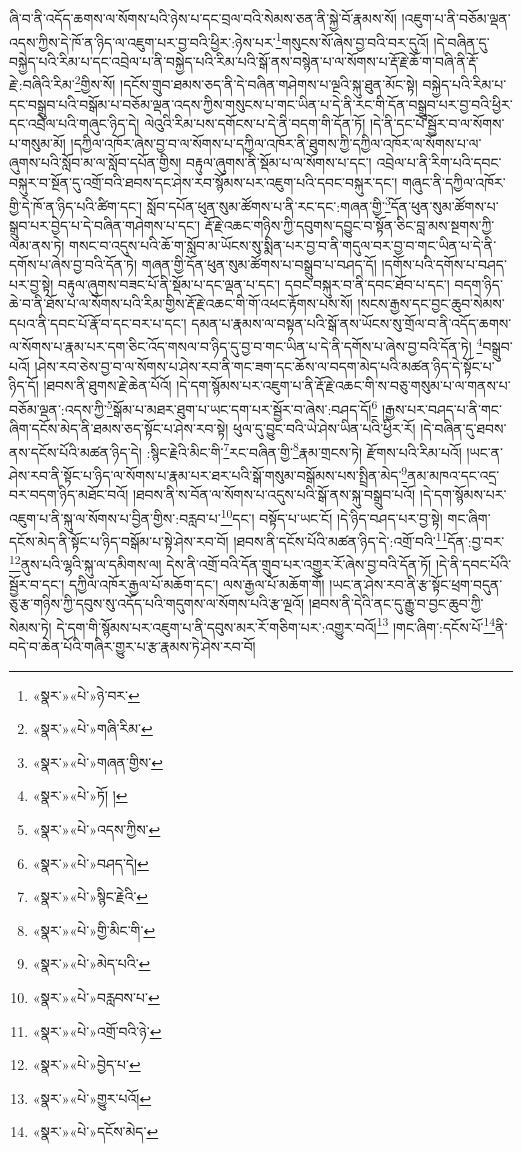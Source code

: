 ཞི་བ་ནི་འདོད་ཆགས་ལ་སོགས་པའི་ཉེས་པ་དང་བྲལ་བའི་སེམས་ཅན་ནི་སྐྱེ་བོ་རྣམས་སོ། །འཇུག་པ་ནི་བཅོམ་ལྡན་འདས་ཀྱིས་དེ་ཁོ་ན་ཉིད་ལ་འཇུག་པར་བྱ་བའི་ཕྱིར་:ཉེས་པར་\footnote{«སྣར་»«པེ་»ཉེ་བར་}གསུངས་སོ་ཞེས་བྱ་བའི་བར་དུའོ། །དེ་བཞིན་དུ་བསྐྱེད་པའི་རིམ་པ་དང་འབྲེལ་པ་ནི་བསྐྱེད་པའི་རིམ་པའི་སྒོ་ནས་བསྙེན་པ་ལ་སོགས་པ་རྡོ་རྗེ་ཆོ་ག་བཞི་ནི་རྡོ་རྗེ་:བཞིའི་རིམ་\footnote{«སྣར་»«པེ་»གཞི་རིམ་}གྱིས་སོ། །དངོས་གྲུབ་ཐམས་ཅད་ནི་དེ་བཞིན་གཤེགས་པ་ལྔའི་སྐུ་ཐུན་མོང་སྟེ། བསྐྱེད་པའི་རིམ་པ་དང་བསྒྲུབ་པའི་བསྒོམ་པ་བཅོམ་ལྡན་འདས་ཀྱིས་གསུངས་པ་གང་ཡིན་པ་དེ་ནི་རང་གི་དོན་བསྒྲུབ་པར་བྱ་བའི་ཕྱིར་དང་འབྲེལ་པའི་གཞུང་ཉིད་དེ། ལེའུའི་རིམ་པས་དགོངས་པ་དེ་ནི་བདག་གི་དོན་ཏོ། །དེ་ནི་དང་པོ་སྦྱོར་བ་ལ་སོགས་པ་གསུམ་མོ། །དཀྱིལ་འཁོར་ཞེས་བྱ་བ་ལ་སོགས་པ་དཀྱིལ་འཁོར་ནི་ཐུགས་ཀྱི་དཀྱིལ་འཁོར་ལ་སོགས་པ་ལ་ཞུགས་པའི་སློབ་མ་ལ་སློབ་དཔོན་གྱིས། བརྟུལ་ཞུགས་ནི་སྡོམ་པ་ལ་སོགས་པ་དང་། འབྲེལ་པ་ནི་རིག་པའི་དབང་བསྐུར་བ་སྔོན་དུ་འགྲོ་བའི་ཐབས་དང་ཤེས་རབ་སྙོམས་པར་འཇུག་པའི་དབང་བསྐུར་དང་། གཞུང་ནི་དཀྱིལ་འཁོར་གྱི་དེ་ཁོ་ན་ཉིད་པའི་ཚིག་དང་། སློབ་དཔོན་ཕུན་སུམ་ཚོགས་པ་ནི་རང་དང་:གཞན་གྱི་\footnote{«སྣར་»«པེ་»གཞན་གྱིས་}དོན་ཕུན་སུམ་ཚོགས་པ་སྒྲུབ་པར་བྱེད་པ་དེ་བཞིན་གཤེགས་པ་དང་། རྡོ་རྗེ་འཆང་གཉིས་ཀྱི་དབུགས་དབྱུང་བ་སྟོན་ཅིང་བླ་མས་སྔགས་ཀྱི་ལམ་ནས་ཏེ། གསང་བ་འདུས་པའི་ཆོ་ག་སློབ་མ་ཡོངས་སུ་སྨིན་པར་བྱ་བ་ནི་གདུལ་བར་བྱ་བ་གང་ཡིན་པ་དེ་ནི་དགོས་པ་ཞེས་བྱ་བའི་དོན་ཏེ། གཞན་གྱི་དོན་ཕུན་སུམ་ཚོགས་པ་བསྒྲུབ་པ་བཤད་དོ། །དགོས་པའི་དགོས་པ་བཤད་པར་བྱ་སྟེ། བརྟུལ་ཞུགས་བཟང་པོ་ནི་སྡོམ་པ་དང་ལྡན་པ་དང་། དབང་བསྐུར་བ་ནི་དབང་ཐོབ་པ་དང་། བདག་ཉིད་ཆེ་བ་ནི་ཐོས་པ་ལ་སོགས་པའི་རིམ་གྱིས་རྡོ་རྗེ་འཆང་གི་གོ་འཕང་རྟོགས་པས་སོ། །སངས་རྒྱས་དང་བྱང་ཆུབ་སེམས་དཔའ་ནི་དབང་པོ་རྣོ་བ་དང་བར་པ་དང་། དམན་པ་རྣམས་ལ་བསྟན་པའི་སྒོ་ནས་ཡོངས་སུ་གྲོལ་བ་ནི་འདོད་ཆགས་ལ་སོགས་པ་རྣམ་པར་དག་ཅིང་འོད་གསལ་བ་ཉིད་དུ་བྱ་བ་གང་ཡིན་པ་དེ་ནི་དགོས་པ་ཞེས་བྱ་བའི་དོན་ཏེ། \footnote{«སྣར་»«པེ་»ཏོ། ། }བསྒྲུབ་པའོ། །ཤེས་རབ་ཅེས་བྱ་བ་ལ་སོགས་པ་ཤེས་རབ་ནི་གང་ཟག་དང་ཆོས་ལ་བདག་མེད་པའི་མཚན་ཉིད་དེ་སྟོང་པ་ཉིད་དོ། །ཐབས་ནི་ཐུགས་རྗེ་ཆེན་པོའོ། །དེ་དག་སྙོམས་པར་འཇུག་པ་ནི་རྡོ་རྗེ་འཆང་གི་ས་བཅུ་གསུམ་པ་ལ་གནས་པ་བཅོམ་ལྡན་:འདས་ཀྱི་\footnote{«སྣར་»«པེ་»འདས་ཀྱིས་}སྒོམ་པ་མཐར་ཐུག་པ་ཡང་དག་པར་སྦྱོར་བ་ཞེས་:བཤད་དོ།\footnote{«སྣར་»«པེ་»བཤད་དེ།} །རྒྱས་པར་བཤད་པ་ནི་གང་ཞིག་དངོས་མེད་ནི་ཐམས་ཅད་སྟོང་པ་ཤེས་རབ་སྟེ། ཕུལ་དུ་བྱུང་བའི་ཡེ་ཤེས་ཡིན་པའི་ཕྱིར་རོ། །དེ་བཞིན་དུ་ཐབས་ནས་དངོས་པོའི་མཚན་ཉིད་དེ། :སྙིང་རྗེའི་མིང་གི་\footnote{«སྣར་»«པེ་»སྙིང་རྗེའི་}རང་བཞིན་གྱི་\footnote{«སྣར་»«པེ་»གྱི་མིང་གི་}རྣམ་གྲངས་ཏེ། རྫོགས་པའི་རིམ་པའོ། །ཡང་ན་ཤེས་རབ་ནི་སྟོང་པ་ཉིད་ལ་སོགས་པ་རྣམ་པར་ཐར་པའི་སྒོ་གསུམ་བསྒོམས་པས་སྤྲིན་མེད་\footnote{«སྣར་»«པེ་»མེད་པའི་}ནམ་མཁའ་དང་འདྲ་བར་བདག་ཉིད་མཐོང་བའོ། །ཐབས་ནི་ས་བོན་ལ་སོགས་པ་འདུས་པའི་སྒོ་ནས་སྐུ་བསྒྲུབ་པའོ། །དེ་དག་སྙོམས་པར་འཇུག་པ་ནི་སྐུ་ལ་སོགས་པ་བྱིན་གྱིས་:བརླབ་པ་\footnote{«སྣར་»«པེ་»བརླབས་པ་}དང་། བསྟོད་པ་ཡང་ངོ། །དེ་ཉིད་བཤད་པར་བྱ་སྟེ། གང་ཞིག་དངོས་མེད་ནི་སྟོང་པ་ཉིད་བསྒོམ་པ་སྟེ་ཤེས་རབ་བོ། །ཐབས་ནི་དངོས་པོའི་མཚན་ཉིད་དེ་:འགྲོ་བའི་\footnote{«སྣར་»«པེ་»འགྲོ་བའི་ཉེ་}དོན་:བྱ་བར་\footnote{«སྣར་»«པེ་»བྱེད་པ་}ནུས་པའི་ལྷའི་སྐུ་ལ་དམིགས་ལ། དེས་ནི་འགྲོ་བའི་དོན་གྲུབ་པར་འགྱུར་རོ་ཞེས་བྱ་བའི་དོན་ཏོ། །དེ་ནི་དབང་པོའི་སྦྱོར་བ་དང་། དཀྱིལ་འཁོར་རྒྱལ་པོ་མཆོག་དང་། ལས་རྒྱལ་པོ་མཆོག་གོ། །ཡང་ན་ཤེས་རབ་ནི་རྩ་སྟོང་ཕྲག་བདུན་ཅུ་རྩ་གཉིས་ཀྱི་དབུས་སུ་འདོད་པའི་གདུགས་ལ་སོགས་པའི་རྩ་ལྔའོ། །ཐབས་ནི་དེའི་ནང་དུ་རྒྱུ་བ་བྱང་ཆུབ་ཀྱི་སེམས་ཏེ། དེ་དག་གི་སྙོམས་པར་འཇུག་པ་ནི་དབུས་མར་རོ་གཅིག་པར་:འགྱུར་བའོ།\footnote{«སྣར་»«པེ་»གྱུར་པའོ།} །གང་ཞིག་:དངོས་པོ་\footnote{«སྣར་»«པེ་»དངོས་མེད་}ནི་བདེ་བ་ཆེན་པོའི་གཞིར་གྱུར་པ་རྩ་རྣམས་ཏེ་ཤེས་རབ་བོ། 